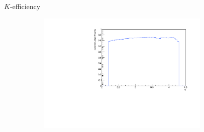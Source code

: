 \documentclass[11pt]{beamer}
\begin{document}
\begin{frame}{$K$-efficiency}
\begin{figure}
\begin{subfigure}{0.45\textwidth}
\end{subfigure}
\begin{subfigure}{0.45\textwidth}
\includegraphics[width=0.9\textwidth]{up_pdf/single/neg/h_eta_reco_K_neg.pdf}
\end{subfigure}
\end{figure}
\end{frame}
\end{document}
